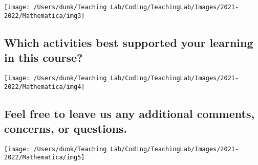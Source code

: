 \documentclass[10,a4paperpaper,]{article}
\begin{document}
\begin{center}\texttt{[image: /Users/dunk/Teaching Lab/Coding/TeachingLab/Images/2021-2022/Mathematica/img3]} \end{center}

\subsection{Which activities best supported your learning in this course?}

\begin{center}\texttt{[image: /Users/dunk/Teaching Lab/Coding/TeachingLab/Images/2021-2022/Mathematica/img4]} \end{center}

\subsection{Feel free to leave us any additional comments, concerns, or questions.}

\begin{center}\texttt{[image: /Users/dunk/Teaching Lab/Coding/TeachingLab/Images/2021-2022/Mathematica/img5]} \end{center}
\end{document}
